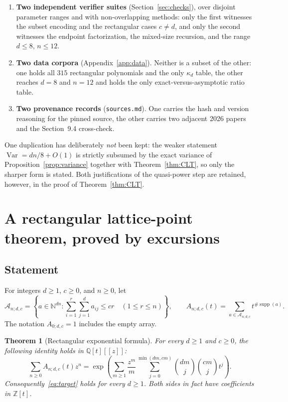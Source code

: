 \documentclass[11pt]{article}
\numberwithin{equation}{section}
\newtheorem{theorem}{Theorem}[section]
\theoremstyle{definition}
\newcommand{\N}{\mathbb N}
\newcommand{\Z}{\mathbb Z}
\newcommand{\Q}{\mathbb Q}
\newcommand{\supp}{\operatorname{supp}}
\newcommand{\Var}{\operatorname{Var}}
\newcommand{\Adc}[1]{A_{#1;d,c}}
\begin{document}
\begin{enumerate}[leftmargin=1.5em,itemsep=0.25em]
 (Corollary~\ref{cor:quartic} and the second pair displayed after it). They
 eliminate different auxiliary quantities and are checked by two different
 scripts.
\item \textbf{Two independent verifier suites}
 (Section~\ref{sec:checks}), over disjoint parameter ranges and with
 non-overlapping methods: only the first witnesses the subset encoding and the
 rectangular cases $c\neq d$, and only the second witnesses the endpoint
 factorization, the mixed-size recursion, and the range $d\leq8$, $n\leq12$.
\item \textbf{Two data corpora} (Appendix~\ref{app:data}). Neither is a subset
 of the other: one holds all $315$ rectangular polynomials and the only
 $\kappa_d$ table, the other reaches $d=8$ and $n=12$ and holds the only
 exact-versus-asymptotic ratio table.
\item \textbf{Two provenance records} (\texttt{sources.md}). One carries the
 hash and version reasoning for the pinned source, the other carries two
 adjacent 2026 papers and the Section~9.4 cross-check.
\end{enumerate}

One duplication has deliberately \emph{not} been kept: the weaker statement
$\Var=dn/8+O(1)$ is strictly subsumed by the exact variance of
Proposition~\ref{prop:variance} together with Theorem~\ref{thm:CLT}, so only
the sharper form is stated. Both justifications of the quasi-power step are
retained, however, in the proof of Theorem~\ref{thm:CLT}.

\section{A rectangular lattice-point theorem, proved by excursions}
\label{sec:proof}

\subsection{Statement}
For integers $d\geq1$, $c\geq0$, and $n\geq0$, let
\begin{equation}
 \mathcal A_{n;d,c}=\left\{a\in\N^{dn}:
  \sum_{i=1}^{r}\sum_{j=1}^{d}a_{ij}\leq cr\quad(1\leq r\leq n)\right\},
 \qquad
 \Adc n(t)=\sum_{a\in\mathcal A_{n;d,c}}t^{\#\supp(a)}.
 \label{eq:rectdef}
\end{equation}
The notation $\Adc0=1$ includes the empty array.

\begin{theorem}[Rectangular exponential formula]
\label{thm:main}
For every $d\geq1$ and $c\geq0$, the following identity holds in
$\Q[t][[z]]$:
\begin{equation}
 \boxed{\sum_{n\geq0}\Adc n(t)z^n
 =\exp\left(\sum_{m\geq1}\frac{z^m}{m}
       \sum_{j=0}^{\min(dm,cm)}\binom{dm}{j}\binom{cm}{j}t^j\right).}
 \label{eq:rectangular}
\end{equation}
Consequently~\eqref{eq:target} holds for every $d\geq1$. Both sides in fact
have coefficients in $\Z[t]$.
\end{theorem}
\end{document}

